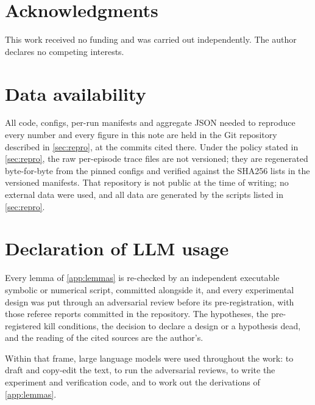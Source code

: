 \documentclass[11pt]{article}
\theoremstyle{definition}
\theoremstyle{remark}
\begin{document}
\section*{Acknowledgments}
This work received no funding and was carried out independently. The author
declares no competing interests.

\section*{Data availability}
All code, configs, per-run manifests and aggregate JSON needed to reproduce every
number and every figure in this note are held in the Git repository described in
\cref{sec:repro}, at the commits cited there. Under the policy stated in
\cref{sec:repro}, the raw per-episode trace files are not versioned; they are
regenerated byte-for-byte from the pinned configs and verified against the
SHA256 lists in the versioned manifests. That repository is not public at the
time of writing; no external data were used, and all data are generated by the
scripts listed in \cref{sec:repro}.

\section*{Declaration of LLM usage}
Every lemma of \cref{app:lemmas} is re-checked by an independent executable
symbolic or numerical script, committed alongside it, and every experimental
design was put through an adversarial review before its pre-registration, with
those referee reports committed in the repository. The hypotheses, the
pre-registered kill conditions, the decision to declare a design or a hypothesis
dead, and the reading of the cited sources are the author's.

Within that frame, large language models were used throughout the work: to draft
and copy-edit the text, to run the adversarial reviews, to write the experiment
and verification code, and to work out the derivations of \cref{app:lemmas}.
\end{document}
